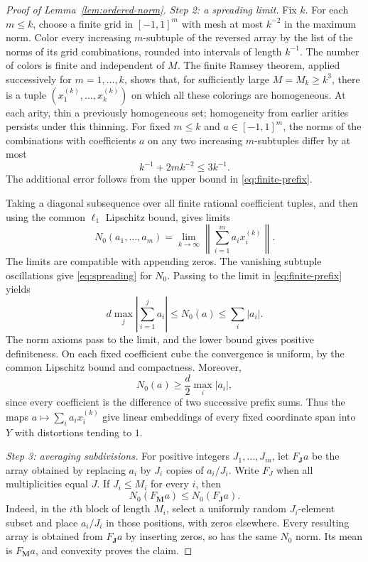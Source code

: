 \documentclass[11pt]{article}
\theoremstyle{definition}
\theoremstyle{remark}
\newcommand{\norm}[1]{\left\lVert #1\right\rVert}
\newcommand{\abs}[1]{\left\lvert #1\right\rvert}
\begin{document}
\begin{proof}[Proof of Lemma~\ref{lem:ordered-norm}]
\par\smallskip
{}
\noindent\emph{Step 2: a spreading limit.}
Fix $k$. For each $m\leq k$, choose a finite grid in $[-1,1]^m$
with mesh at most $k^{-2}$ in the maximum norm. Color every increasing
$m$-subtuple of the reversed array by the list of the norms of its
grid combinations, rounded into intervals of length $k^{-1}$.
The number of colors is finite and independent of $M$.
The finite Ramsey theorem, applied successively for $m=1,\ldots,k$,
shows that, for sufficiently large $M=M_k\geq k^3$, there is a tuple
$(x_1^{(k)},\ldots,x_k^{(k)})$ on which all these colorings are homogeneous.
At each arity, thin a previously homogeneous set; homogeneity from
earlier arities persists under this thinning.
For fixed $m\leq k$ and $a\in[-1,1]^m$, the norms of the combinations
with coefficients $a$ on any two increasing $m$-subtuples differ by at most
\[
 k^{-1}+2mk^{-2}\leq3k^{-1}.
\]
The additional error follows from the upper bound in
\eqref{eq:finite-prefix}.

Taking a diagonal subsequence over all finite rational coefficient
tuples, and then using the common $\ell_1$ Lipschitz bound, gives limits
\[
 N_0(a_1,\ldots,a_m)
 =\lim_{k\to\infty}\norm{\sum_{i=1}^m a_i x_i^{(k)}}.
\]
The limits are compatible with appending zeros. The vanishing
subtuple oscillations give \eqref{eq:spreading} for $N_0$.
Passing to the limit in \eqref{eq:finite-prefix} yields
\begin{equation}\label{eq:N0-bounds}
 d\max_j\abs{\sum_{i=1}^j a_i}\leq N_0(a)\leq\sum_i|a_i|.
\end{equation}
The norm axioms pass to the limit, and the lower bound gives positive
definiteness. On each fixed coefficient cube the convergence is uniform,
by the common Lipschitz bound and compactness.
Moreover,
\begin{equation}\label{eq:nondegenerate}
 N_0(a)\geq\frac d2\max_i|a_i|,
\end{equation}
since every coefficient is the difference of two successive prefix sums.
Thus the maps $a\mapsto\sum_i a_i x_i^{(k)}$ give linear embeddings
of every fixed coordinate span into $Y$ with distortions tending to $1$.

\par\smallskip
{}
\noindent\emph{Step 3: averaging subdivisions.}
For positive integers $J_1,\ldots,J_m$, let $F_{\boldsymbol J}a$ be the
array obtained by replacing $a_i$ by $J_i$ copies of $a_i/J_i$.
Write $F_J$ when all multiplicities equal $J$.
If $J_i\leq M_i$ for every $i$, then
\begin{equation}\label{eq:dilation-monotone}
 N_0(F_{\boldsymbol M}a)\leq N_0(F_{\boldsymbol J}a).
\end{equation}
Indeed, in the $i$th block of length $M_i$, select a uniformly random
$J_i$-element subset and place $a_i/J_i$ in those positions, with zeros
elsewhere. Every resulting array is obtained from
$F_{\boldsymbol J}a$ by inserting zeros, so has the same $N_0$ norm.
Its mean is $F_{\boldsymbol M}a$, and convexity proves the claim.


\end{proof}
\end{document}
